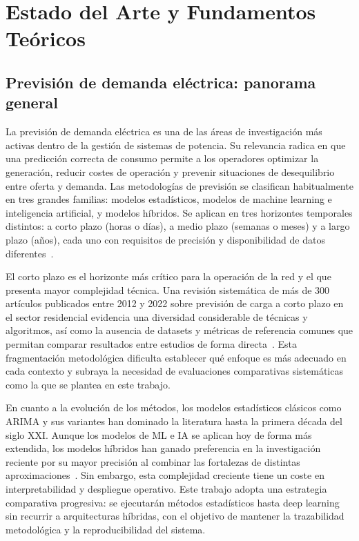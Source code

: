 \documentclass[12pt, a4paper]{article}
\begin{document}
\section{Estado del Arte y Fundamentos Teóricos}

\subsection{Previsión de demanda eléctrica: panorama general}

La previsión de demanda eléctrica es una de las áreas de investigación más activas dentro de la gestión de sistemas de potencia. Su relevancia radica en que una predicción correcta de consumo permite a los operadores optimizar la generación, reducir costes de operación y prevenir situaciones de desequilibrio entre oferta y demanda. Las metodologías de previsión se clasifican habitualmente en tres grandes familias: modelos estadísticos, modelos de machine learning e inteligencia artificial, y modelos híbridos. Se aplican en tres horizontes temporales distintos: a corto plazo (horas o días), a medio plazo (semanas o meses) y a largo plazo (años), cada uno con requisitos de precisión y disponibilidad de datos diferentes~\cite{ugbehe2025}.

El corto plazo es el horizonte más crítico para la operación de la red y el que presenta mayor complejidad técnica. Una revisión sistemática de más de 300 artículos publicados entre 2012 y 2022 sobre previsión de carga a corto plazo en el sector residencial evidencia una diversidad considerable de técnicas y algoritmos, así como la ausencia de datasets y métricas de referencia comunes que permitan comparar resultados entre estudios de forma directa~\cite{melicio2023}. Esta fragmentación metodológica dificulta establecer qué enfoque es más adecuado en cada contexto y subraya la necesidad de evaluaciones comparativas sistemáticas como la que se plantea en este trabajo.

En cuanto a la evolución de los métodos, los modelos estadísticos clásicos como ARIMA y sus variantes han dominado la literatura hasta la primera década del siglo XXI. Aunque los modelos de ML e IA se aplican hoy de forma más extendida, los modelos híbridos han ganado preferencia en la investigación reciente por su mayor precisión al combinar las fortalezas de distintas aproximaciones~\cite{ugbehe2025}. Sin embargo, esta complejidad creciente tiene un coste en interpretabilidad y despliegue operativo. Este trabajo adopta una estrategia comparativa progresiva: se ejecutarán métodos estadísticos hasta deep learning sin recurrir a arquitecturas híbridas, con el objetivo de mantener la trazabilidad metodológica y la reproducibilidad del sistema.
\end{document}
